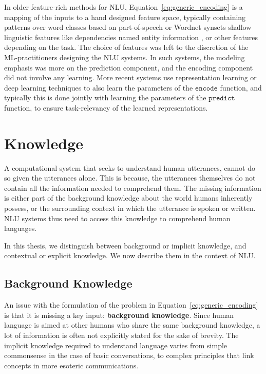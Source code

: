 In older feature-rich methods for NLU, 
Equation~\ref{eq:generic_encoding} is a mapping of the inputs to a hand designed feature space, typically containing patterns over word classes based on
part-of-speech \citep{corley2005measuring} or Wordnet synsets \citep{moldovan2001logic} shallow linguistic features like dependencies \citep{bos2005recognising}
named entity information \cite{tatu2005semantic}, or other features depending on the task. The choice of features was left to the discretion of the ML-practitioners
designing the NLU systems. In such systems, the modeling emphasis was more on the prediction component, and the encoding component did not involve any learning. 
More recent systems \citep[among many others]{bahdanau:14,weston2014memory,hermann2015teaching,Xiong2016DynamicMN,bowman2016fast,yang:16} 
use representation learning or deep learning techniques to also learn the parameters of the
$\mathtt{encode}$ function, and typically this is done jointly with learning the parameters of the $\mathtt{predict}$ function, to ensure task-relevancy of the learned representations.

\section{Knowledge}
\label{sec:intro_external_knowledge}
A computational system that seeks to understand human utterances, cannot do so given the utterances alone. This is because, the utterances themselves
do not contain all the information needed to comprehend them. The missing information is either part of the background knowledge about the world humans
inherently possess, or the surrounding context in which the utterance is spoken or written. NLU systems thus need to access this knowledge to comprehend
human languages.

In this thesis, we distinguish between background or implicit knowledge, and contextual or explicit knowledge. We now describe them in the context of NLU.

\subsection{Background Knowledge}
An issue with the formulation of the problem in Equation~\ref{eq:generic_encoding} is that it is missing a key input: \textbf{background knowledge}. 
Since human language is aimed at other humans who share 
the same background knowledge, a lot of information is often not explicitly stated
for the sake of brevity. The implicit knowledge required to understand language varies 
from simple commonsense in the case of basic conversations, to complex principles that link 
concepts in more esoteric communications.

